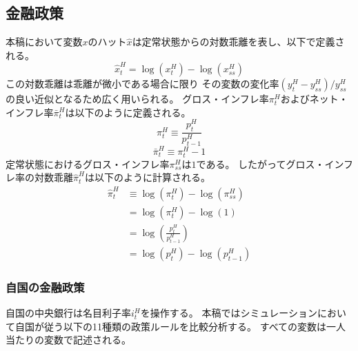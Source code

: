 
\subsection{金融政策}
\label{sec:chapter3_policies_monetary}
本稿において変数\(x\)のハット\(\hat{x}\)は定常状態からの対数乖離を表し、以下で定義される。
\begin{equation}
\label{sec:chapter3_policies_monetary_hat_def}
    \hat{x}_t^H=\log(x_t^H)-\log(x_{ss}^H)
\end{equation}
この対数乖離は乖離が微小である場合に限り
その変数の変化率\((y_t^H-y_{ss}^H)/y_{ss}^H\)の良い近似となるため広く用いられる。
グロス・インフレ率\(\pi_t^H\)およびネット・インフレ率\(\bar{\pi}_t^H\)は以下のように定義される。
\begin{equation}
\label{form:chapter3_policies_monetary_pi_H_def}
    \pi_t^H\equiv\frac{p_t^H}{p_{t-1}^H}
\end{equation}
\begin{equation}
\label{form:chapter3_policies_monetary_pi_H_bar_def}
    \bar{\pi}_t^H\equiv\pi_t^H-1
\end{equation}
定常状態におけるグロス・インフレ率\(\pi_{ss}^H\)は\(1\)である。
したがってグロス・インフレ率の対数乖離\(\hat{\pi}_t^H\)は以下のように計算される。
\begin{equation}
\label{form:chapter3_policies_monetary_hat_pi_H_eq}
    \begin{aligned}
        \hat{\pi}_t^H&\equiv\log(\pi_t^H)-\log(\pi_{ss}^H) \\
        &=\log(\pi_t^H)-\log(1) \\
        &=\log\left(\frac{p_t^H}{p_{t-1}^H}\right) \\
        &=\log(p_t^H)-\log(p_{t-1}^H)
    \end{aligned}
\end{equation}

\subsubsection{自国の金融政策}
\label{sec:chapter3_policies_monetary_home}
自国の中央銀行は名目利子率\(i_t^H\)を操作する。
本稿ではシミュレーションにおいて自国が従う以下の11種類の政策ルールを比較分析する。
すべての変数は一人当たりの変数で記述される。

